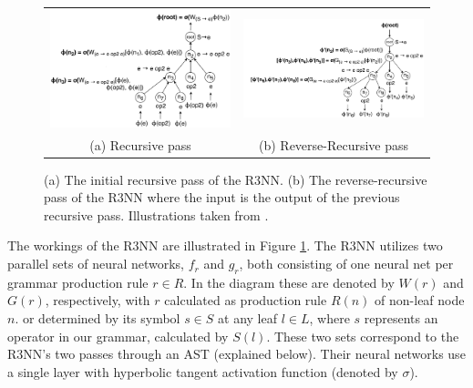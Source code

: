 \documentclass{article} %
\begin{document}
\begin{figure}[h]
    \begin{tabular}{cc}
        \begin{minipage}{0.45\linewidth}
            \includegraphics[scale=0.16]{figures/tree2.png}
        \end{minipage}
        &
        \begin{minipage}{0.55\linewidth}
            \includegraphics[scale=0.16]{figures/tree3.png}
        \end{minipage}
        \\
        (a) Recursive pass & (b) Reverse-Recursive pass
    \end{tabular}
    \caption{(a) The initial recursive pass of the R3NN. (b) The reverse-recursive pass of the R3NN where the input is the output of the previous recursive pass. Illustrations taken from \citep{nsps}.}
    \label{r3nn}
\end{figure}

The workings of the R3NN are illustrated in Figure \ref{r3nn}.
The R3NN utilizes two parallel sets of neural networks, $f_r$ and $g_r$,
both consisting of one neural net per grammar production rule $r \in R$.
In the diagram these are denoted by $W(r)$ and $G(r)$, respectively,
with $r$ calculated as production rule $R(n)$ of non-leaf node $n$.
or determined by its symbol $s \in S$ at any leaf $l \in L$,
where $s$ represents an operator in our grammar, calculated by $S(l)$.
These two sets correspond to the R3NN's two passes through an AST (explained below).
Their neural networks use a single layer with hyperbolic tangent activation function (denoted by $\sigma$).
\end{document}
